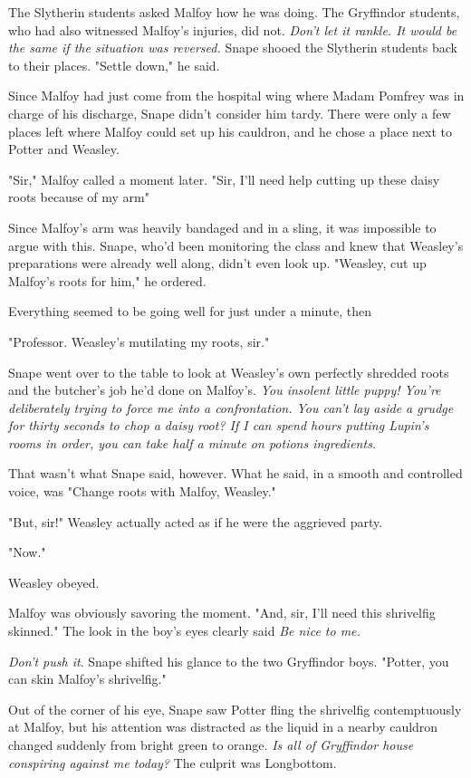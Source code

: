 The Slytherin students asked Malfoy how he was doing. The Gryffindor students, who had also witnessed Malfoy's injuries, did not. \emph{Don't let it rankle. It would be the same if the situation was reversed.} Snape shooed the Slytherin students back to their places. "Settle down," he said.

Since Malfoy had just come from the hospital wing where Madam Pomfrey was in charge of his discharge, Snape didn't consider him tardy. There were only a few places left where Malfoy could set up his cauldron, and he chose a place next to Potter and Weasley.

"Sir," Malfoy called a moment later. "Sir, I'll need help cutting up these daisy roots because of my arm{\el}"

Since Malfoy's arm was heavily bandaged and in a sling, it was impossible to argue with this. Snape, who'd been monitoring the class and knew that Weasley's preparations were already well along, didn't even look up. "Weasley, cut up Malfoy's roots for him," he ordered.

Everything seemed to be going well for just under a minute, then{\el}

"Professor. Weasley's mutilating my roots, sir."

Snape went over to the table to look at Weasley's own perfectly shredded roots and the butcher's job he'd done on Malfoy's. \emph{You insolent little puppy! You're deliberately trying to force me into a confrontation. You can't lay aside a grudge for thirty seconds to chop a daisy root? If I can spend hours putting Lupin's rooms in order, you can take half a minute on potions ingredients.}

That wasn't what Snape said, however. What he said, in a smooth and controlled voice, was "Change roots with Malfoy, Weasley."

"But, sir!" Weasley actually acted as if he were the aggrieved party.

"Now."

Weasley obeyed.

Malfoy was obviously savoring the moment. "And, sir, I'll need this shrivelfig skinned." The look in the boy's eyes clearly said \emph{Be nice to me.}

\emph{Don't push it}. Snape shifted his glance to the two Gryffindor boys. "Potter, you can skin Malfoy's shrivelfig."

Out of the corner of his eye, Snape saw Potter fling the shrivelfig contemptuously at Malfoy, but his attention was distracted as the liquid in a nearby cauldron changed suddenly from bright green to orange. \emph{Is all of Gryffindor house conspiring against me today?} The culprit was Longbottom.

